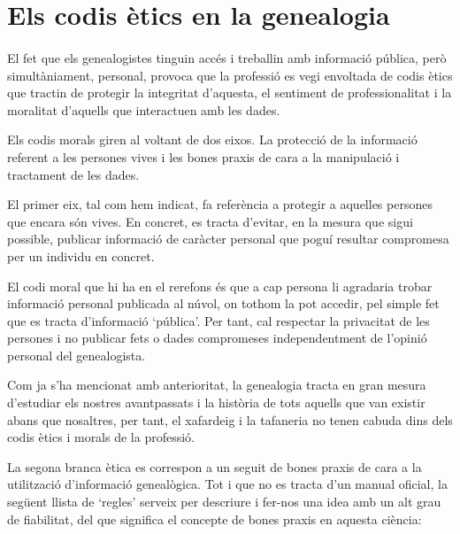 \section{Els codis ètics en la genealogia}

    \paragraph{}
    El fet que els genealogistes tinguin accés i treballin amb informació pública, però simultàniament, personal, provoca que la professió es vegi envoltada de codis ètics que tractin de protegir la integritat d'aquesta, el sentiment de professionalitat i la moralitat d'aquells que interactuen amb les dades.

    Els codis morals giren al voltant de dos eixos. La protecció de la informació referent a les persones vives i les bones praxis de cara a la manipulació i tractament de les dades.

    El primer eix, tal com hem indicat, fa referència a protegir a aquelles persones que encara són vives. En concret, es tracta d'evitar, en la mesura que sigui possible, publicar informació de caràcter personal que poguí resultar compromesa per un individu en concret.

    El codi moral que hi ha en el rerefons és que a cap persona li agradaria trobar informació personal publicada al núvol, on tothom la pot accedir, pel simple fet que es tracta d'informació `pública'. Per tant, cal respectar la privacitat de les persones i no publicar fets o dades compromeses independentment de l'opinió personal del genealogista.

    Com ja s'ha mencionat amb anterioritat, la genealogia tracta en gran mesura d'estudiar els nostres avantpassats i la història de tots aquells que van existir abans que nosaltres, per tant, el xafardeig i la tafaneria no tenen cabuda dins dels codis ètics i morals de la professió.

    La segona branca ètica es correspon a un seguit de bones praxis de cara a la utilització d'informació genealògica. Tot i que no es tracta d'un manual oficial, la següent llista de `regles' serveix per descriure i fer-nos una idea amb un alt grau de fiabilitat, del que significa el concepte de bones praxis en aquesta ciència:

